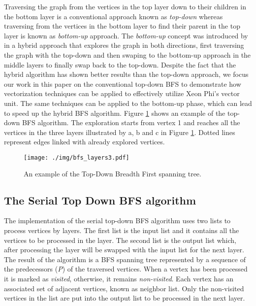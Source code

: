 \documentclass{sig-alternate-05-2015}
\begin{document}
 Traversing the graph from the vertices in the top layer down to their
 children in the bottom layer is a conventional approach known as
 \textit{top-down} whereas traversing from the vertices in the bottom
 layer to find their parent in the top layer is known as
 \textit{bottom-up} approach. The \textit{bottom-up} concept was
 introduced by \cite{Beamer:2012} in a hybrid approach that explores
 the graph in both directions, first traversing the graph with the
 top-down and then swaping to the bottom-up approach in the middle layers
 to finally swap back to the top-down.
Despite the fact that the hybrid algorithm has shown better results
than the top-down approach, we focus our work in this paper on the
conventional top-down BFS to demonstrate how vectorization techniques
can be applied to effectively utilize Xeon Phi's vector unit. The same
techniques can be applied to the bottom-up phase, which can lead to
speed up the hybrid BFS algorithm.  Figure \ref{fig:bfslayers} shows
an example of the top-down BFS algorithm.  The exploration starts from
vertex 1 and reaches all the vertices in the three layers illustrated
by a, b and c in Figure \ref{fig:bfslayers}. Dotted lines represent
edges linked with already explored vertices.

\begin{figure}
\centering
\texttt{[image: ./img/bfs\_layers3.pdf]}
\caption{An example of the Top-Down Breadth First spanning tree.}
\label{fig:bfslayers}
\vspace{-3mm}
\end{figure}


\subsection{The Serial Top Down BFS algorithm}
\label{sec:serBFS}
The implementation of the serial top-down BFS algorithm uses two lists
to process vertices by layers. The first list is the input list and it
contains all the vertices to be processed in the layer. The second
list is the output list which, after processing the layer will be
swapped with the input list for the next layer. The result of the
algorithm is a BFS spanning tree represented by a sequence of the
predecessors (\textit{P}) of the traversed vertices. When a vertex has
been processed it is marked as \textit{visited}, otherwise, it remains
\textit{non-visited}. Each vertex has an associated set of adjacent
vertices, known as neighbor list. Only the non-visited vertices in the
list are put into the output list to be processed in the next layer.
 
\end{document}
